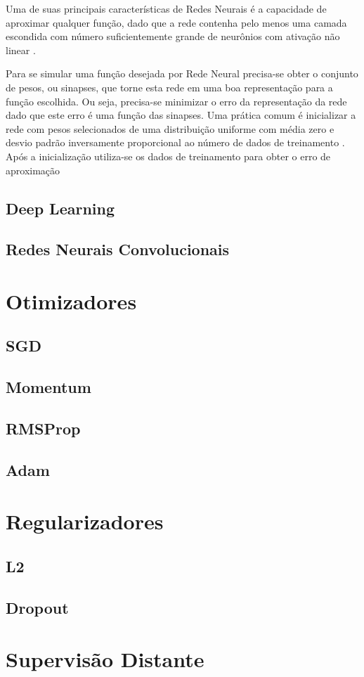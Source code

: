 Uma de suas principais características de Redes Neurais é a capacidade de aproximar qualquer função, dado que a rede contenha pelo menos uma camada escondida com número suficientemente grande de neurônios com ativação não linear \cite{hornik89}.

Para se simular uma função desejada por Rede Neural precisa-se obter o conjunto de pesos, ou sinapses, que torne esta rede em uma boa representação para a função escolhida. Ou seja, precisa-se minimizar o erro da representação da rede dado que este erro é uma função das sinapses. Uma prática comum é inicializar a rede com pesos selecionados de uma distribuição uniforme com média zero e desvio padrão inversamente proporcional ao número de dados de treinamento \cite{lecun12}. Após a inicialização utiliza-se os dados de treinamento para obter o erro de aproximação 

\subsection{Deep Learning}

\subsection{Redes Neurais Convolucionais} \label{sec:convolucionais}

\section{Otimizadores}

\subsection{SGD}

\subsection{Momentum}

\subsection{RMSProp}

\subsection{Adam}

\section{Regularizadores} \label{sec:regularizadores}

\subsection{L2}

\subsection{Dropout}

\section{Supervisão Distante}
